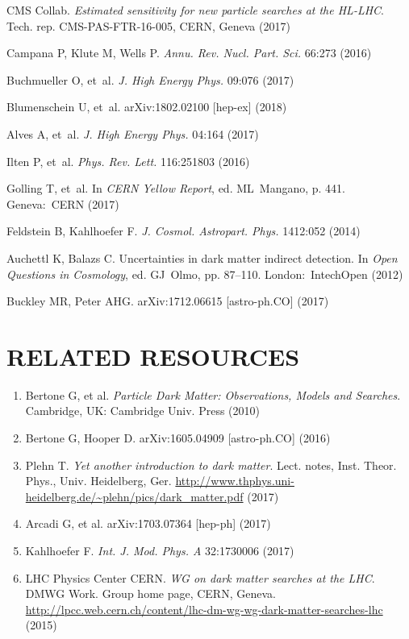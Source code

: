 \documentclass{ar-1col}
\begin{document}
\begin{thebibliography}{175}
{CMS Collab}. \textit{Estimated sensitivity for new particle searches at the HL-LHC}.
Tech. rep. CMS-PAS-FTR-16-005, CERN, Geneva (2017)

Campana P, Klute M, Wells P. \textit{Annu. Rev. Nucl. Part. Sci.}
66:273 (2016)

Buchmueller O, et~al. \textit{J. High Energy Phys.} 09:076 (2017)

Blumenschein U, et~al. arXiv:1802.02100 [hep-ex] (2018)


Alves A, et~al. \textit{J. High Energy Phys.} 04:164 (2017)

Ilten P, et~al. \textit{Phys. Rev. Lett.} 116:251803 (2016)

Golling T, et~al. In \textit{CERN Yellow Report}, ed. ML\ Mangano, p. 441. Geneva:\ CERN (2017)

Feldstein B, Kahlhoefer F. \textit{J. Cosmol. Astropart. Phys.} 1412:052 (2014)

Auchettl K, Balazs C. {Uncertainties in dark matter indirect detection}. In \textit{Open Questions in Cosmology}, ed. GJ\ Olmo, pp. 87--110. London:\ IntechOpen (2012)

Buckley MR, Peter AHG. arXiv:1712.06615 [astro-ph.CO] (2017)


\end{thebibliography}

\section*{RELATED RESOURCES}
\begin{enumerate}
\item Bertone G, et al. \textit{Particle Dark Matter: Observations, Models and Searches}. Cambridge, UK: Cambridge Univ. Press (2010)%

\item Bertone G, Hooper D. arXiv:1605.04909 [astro-ph.CO] (2016)

\item Plehn T. \textit{Yet another introduction to dark matter}. Lect. notes, Inst. Theor. Phys., Univ. Heidelberg, Ger. \url{http://www.thphys.uni-heidelberg.de/~plehn/pics/dark_matter.pdf} (2017)

\item Arcadi G, et al. {arXiv:1703.07364 [hep-ph]} (2017)

\item Kahlhoefer F.  \textit{Int. J. Mod. Phys. A} 32:1730006 (2017)

\item {LHC Physics Center CERN.\textit{ WG on dark matter searches at the LHC}. DMWG Work. Group home page, CERN, Geneva.} \url{http://lpcc.web.cern.ch/content/lhc-dm-wg-wg-dark-matter-searches-lhc} (2015)

\end{enumerate}
\end{document}

